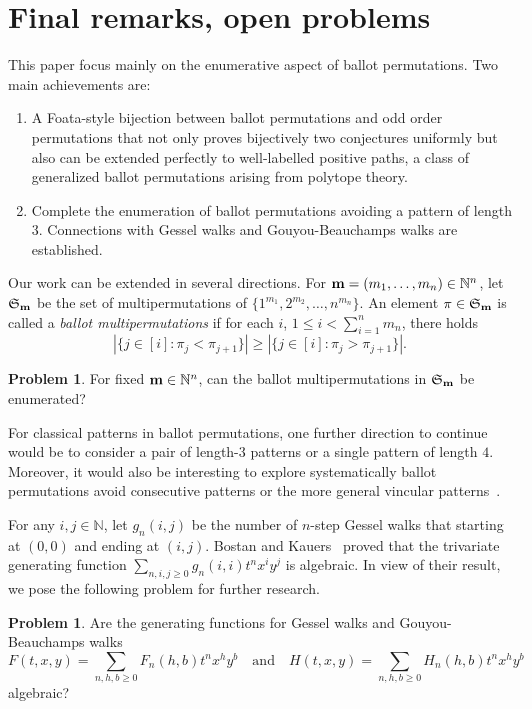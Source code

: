 \documentclass[12pt]{amsart}
\numberwithin{equation}{section}
\theoremstyle{plain}
\theoremstyle{definition}
\newtheorem{?}[theorem]{Problem}
\newcommand{\N}{\mathbb{N}}
\def\S{\mathfrak{S}}
\def\m{{\bf m}}
\begin{document}
\section{Final remarks, open problems}%
\label{sec:5}

This paper focus mainly on the enumerative aspect of ballot permutations. Two main achievements are:
\begin{enumerate}
\item A Foata-style bijection between ballot permutations and odd order permutations that not only proves bijectively  two conjectures uniformly but also can be extended  perfectly to well-labelled positive paths, a class of generalized ballot permutations arising from  polytope theory. 
\item Complete the enumeration of ballot permutations avoiding a pattern of length $3$. Connections with Gessel walks and Gouyou-Beauchamps walks are established. 
\end{enumerate}

Our work can be extended in several directions. For $\m=(m_1,\ldots,m_n)\in\N^n$, let $\S_{\m}$ be the set of multipermutations of $\{1^{m_1},2^{m_2},\ldots,n^{m_n}\}$. An element $\pi\in\S_{\m}$ is called a {\em ballot multipermutations} if for each $i$, $1\leq i<\sum_{i=1}^nm_n$, there holds
$$
|\{j\in[i]: \pi_j<\pi_{j+1}\}|\geq |\{j\in[i]: \pi_j>\pi_{j+1}\}|.
$$

\begin{?}
For fixed $\m\in\N^n$, can the ballot multipermutations in $\S_{\m}$ be enumerated? 
\end{?}
For classical patterns in ballot permutations, one further direction to continue would be to consider a pair of length-$3$ patterns or a single pattern of length $4$.  Moreover, it would also be interesting to explore systematically ballot permutations avoid consecutive patterns or the more general vincular patterns~\cite{kit}. 

For any $i,j\in\N$, let $g_n(i,j)$ be the number of  $n$-step Gessel walks that starting at $(0,0)$ and ending at $(i, j)$. Bostan and  Kauers~\cite{BK} proved that the  trivariate generating function 
$\sum_{n,i,j\geq0} g_n(i,i)t^nx^iy^j$ is algebraic. In view of their result, we pose the following problem for further research. 

\begin{?}
Are the generating functions for Gessel walks and Gouyou-Beauchamps walks
$$
F(t,x,y)=\sum_{n,h,b\geq0} F_n(h,b)t^nx^hy^b\quad\text{and}\quad H(t,x,y)=\sum_{n,h,b\geq0} H_n(h,b)t^nx^hy^b
$$
algebraic? 
\end{?}
\end{document}
